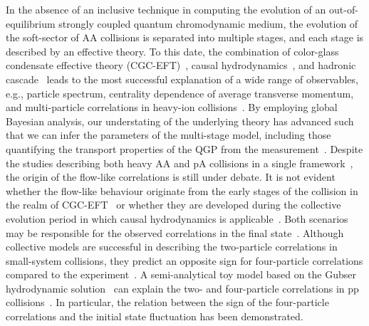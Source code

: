 In the absence of an inclusive technique in computing the evolution of an out-of-equilibrium strongly coupled quantum chromodynamic medium, the evolution of the soft-sector of AA collisions is separated into multiple stages, and each stage is described by an effective theory. To this date, the combination of color-glass condensate effective theory (CGC-EFT)~\cite{Schenke:2012wb,Schenke:2012hg}, causal hydrodynamics~\cite{Kolb:2003dz,Song:2007ux,Dusling:2007gi,Holopainen:2010gz,Schenke:2010rr,Romatschke:2007mq,Niemi:2015qia,Jeon:2015dfa,Romatschke:2017ejr}, and hadronic cascade~\cite{Bass:1998ca,Bleicher:1999xi,Weil:2016zrk} leads to the most successful explanation of a wide range of observables, e.g., particle spectrum, centrality dependence of average transverse momentum, and multi-particle correlations in heavy-ion collisions~\cite{ALICE:2016kpq,Acharya:2017gsw,Acharya:2017zfg,Acharya:2020taj,ALICE:2021klf,ALICE:2021adw,ALICE:2013mez,ALICE:2011ab}. By employing global Bayesian analysis, our understating of the underlying theory has advanced such that we can infer the parameters of the multi-stage model, including those quantifying the transport properties of the QGP from the measurement~\cite{Bernhard:2016tnd,Bernhard:2019bmu,Parkkila:2021tqq,Parkkila:2021yha}. Despite the studies describing both heavy AA and pA collisions in a single framework~\cite{Moreland:2018gsh}, the origin of the flow-like correlations is still under debate. It is not evident whether the flow-like behaviour originate from the early stages of the collision in the realm of CGC-EFT~\cite{Dusling:2012cg,Bzdak:2013zma} or whether they are developed during the collective evolution period in which causal hydrodynamics is applicable~\cite{Greif:2017bnr,Mantysaari:2017cni}. Both scenarios may be responsible for the observed correlations in the final state~\cite{Greif:2017bnr}. Although collective models are successful in describing the two-particle correlations in small-system collisions, they predict an opposite sign for four-particle correlations compared to the experiment~\cite{Khachatryan:2016txc,ATLAS:2017rtr,Zhao:2017rgg}.  A semi-analytical toy model based on the Gubser hydrodynamic solution~\cite{Gubser:2010ze,Gubser:2010ui} can explain the two- and four-particle correlations in pp collisions~\cite{Taghavi:2019mqz}. In particular, the relation between the sign of the four-particle correlations and the initial state fluctuation has been demonstrated. 


